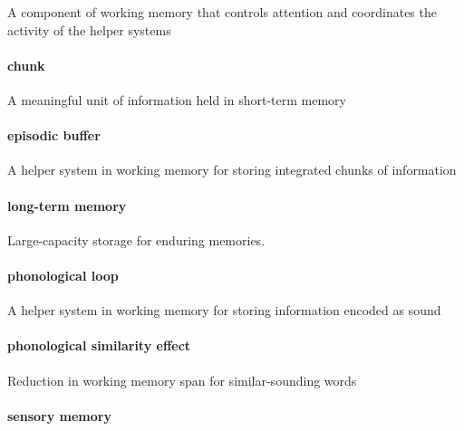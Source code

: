 \documentclass[
]{krantz}
\begin{document}
A component of working memory that controls attention and coordinates the activity of the helper systems

\hypertarget{chunk}{%
\paragraph*{chunk}\label{chunk}}

A meaningful unit of information held in short-term memory

\hypertarget{episodic-buffer}{%
\paragraph*{episodic buffer}\label{episodic-buffer}}

A helper system in working memory for storing integrated chunks of information

\hypertarget{long-term-memory}{%
\paragraph*{long-term memory}\label{long-term-memory}}

Large-capacity storage for enduring memories.

\hypertarget{phonological-loop}{%
\paragraph*{phonological loop}\label{phonological-loop}}

A helper system in working memory for storing information encoded as sound

\hypertarget{phonological-similarity-effect}{%
\paragraph*{phonological similarity effect}\label{phonological-similarity-effect}}

Reduction in working memory span for similar-sounding words

\hypertarget{sensory-memory}{%
\paragraph*{sensory memory}\label{sensory-memory}}
\end{document}
